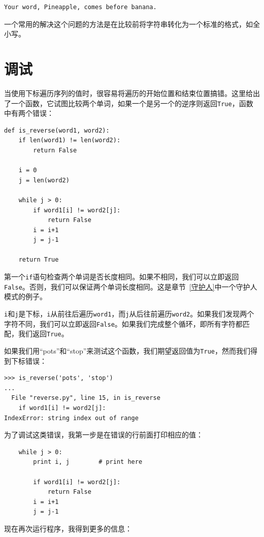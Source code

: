 \beforeverb
\begin{verbatim}
Your word, Pineapple, comes before banana.
\end{verbatim}
\afterverb
%
一个常用的解决这个问题的方法是在比较前将字符串转化为一个标准的格式，如全小写。


\section{调试}

当使用下标遍历序列的值时，很容易将遍历的开始位置和结束位置搞错。这里给出了一个函数，它试图比较两个单词，如果一个是另一个的逆序则返回{\tt True}，函数中有两个错误：

\beforeverb
\begin{verbatim}
def is_reverse(word1, word2):
    if len(word1) != len(word2):
        return False
    
    i = 0
    j = len(word2)

    while j > 0:
        if word1[i] != word2[j]:
            return False
        i = i+1
        j = j-1

    return True
\end{verbatim}
\afterverb
%
第一个{\tt if}语句检查两个单词是否长度相同。如果不相同，我们可以立即返回{\tt False}。否则，我们可以保证两个单词长度相同。这是章节~\ref{守护人}中一个守护人模式的例子。


{\tt i}和{\tt j}是下标，{\tt i}从前往后遍历{\tt word1}，而{\tt j}从后往前遍历{\tt word2}。如果我们发现两个字符不同，我们可以立即返回{\tt False}。如果我们完成整个循环，即所有字符都匹配，我们返回{\tt True}。

如果我们用“pots”和“stop”来测试这个函数，我们期望返回值为{\tt True}，然而我们得到下标错误：


\beforeverb
\begin{verbatim}
>>> is_reverse('pots', 'stop')
...
  File "reverse.py", line 15, in is_reverse
    if word1[i] != word2[j]:
IndexError: string index out of range
\end{verbatim}
\afterverb
%
为了调试这类错误，我第一步是在错误的行前面打印相应的值：

\beforeverb
\begin{verbatim}
    while j > 0:
        print i, j        # print here
        
        if word1[i] != word2[j]:
            return False
        i = i+1
        j = j-1
\end{verbatim}
\afterverb
%
现在再次运行程序，我得到更多的信息：

